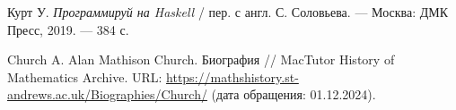 \documentclass[10pt,a4paper,final]{article} %
\begin{document}
\newpage

\begin{thebibliography}{99}
	
	Курт У. \textit{Программируй на Haskell} / пер. с англ. С. Соловьева. — Москва: ДМК Пресс, 2019. — 384 с.
		
	Church A. Alan Mathison Church. Биография // MacTutor History of Mathematics Archive. URL: \href{https://mathshistory.st-andrews.ac.uk/Biographies/Church/}{https://mathshistory.st-andrews.ac.uk/Biographies/Church/} (дата обращения: 01.12.2024).
	
\end{thebibliography}

\end{document}

